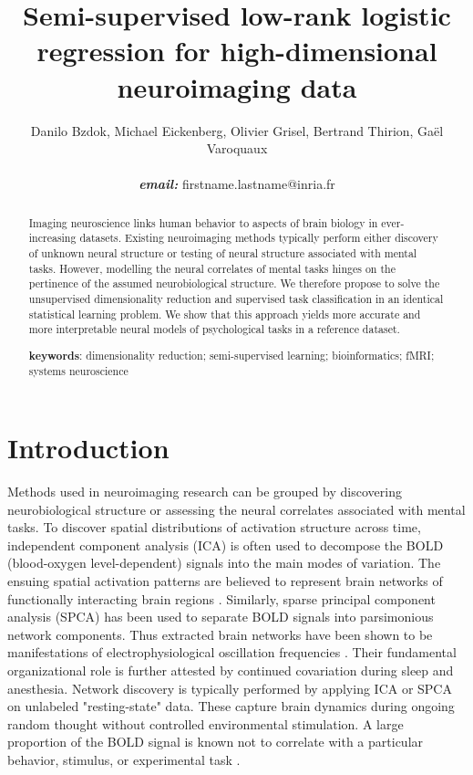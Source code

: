 \documentclass{article} %
\title{Semi-supervised low-rank logistic regression for
high-dimensional neuroimaging data}
\begin{document}
\author{Danilo Bzdok, Michael Eickenberg, Olivier Grisel,
  Bertrand Thirion,
  Ga\"el Varoquaux \\\\\textbf{\textit{email:} }firstname.lastname@inria.fr}

\maketitle

\begin{abstract}
Imaging neuroscience links human behavior to aspects of brain
biology in ever-increasing datasets.
%
Existing neuroimaging methods typically perform either discovery of unknown
neural structure or testing of neural structure associated with mental tasks.
%
However, modelling the neural correlates of mental tasks hinges
on the pertinence of the assumed neurobiological structure.
%
%
We therefore propose to solve the unsupervised dimensionality reduction
and supervised task classification in
an identical statistical learning problem.
%
We show that this approach yields more accurate and more interpretable
neural models of psychological tasks in a reference dataset.
%

\textbf{keywords}: dimensionality reduction; semi-supervised learning;
bioinformatics; fMRI; systems neuroscience

\end{abstract}

\section{Introduction}
%
Methods used in neuroimaging research can be grouped by discovering
neurobiological structure or assessing the neural correlates associated
with mental tasks.
To discover spatial distributions of activation structure across time,
independent component analysis (ICA) \cite{beckmann2005} is often used
to decompose the BOLD (blood-oxygen level-dependent) signals into the
main modes of variation.
The ensuing spatial activation patterns are believed to represent
brain networks of
functionally interacting brain regions \cite{smith2009}.
Similarly, sparse principal component analysis (SPCA) \cite{varoqu2011}
has been used to
separate BOLD signals into parsimonious network components.
Thus extracted brain networks have been shown to be
manifestations of electrophysiological oscillation frequencies \cite{hipp15}.
Their fundamental organizational role is further
attested by continued covariation during sleep and anesthesia.
%
Network discovery is typically performed by applying ICA or SPCA on
unlabeled "resting-state" data. These capture brain dynamics
during ongoing random thought without controlled environmental stimulation.
A large proportion of the BOLD signal is known
not to correlate with a particular behavior, stimulus, or experimental task
\cite{fox07}. 
\end{document}
